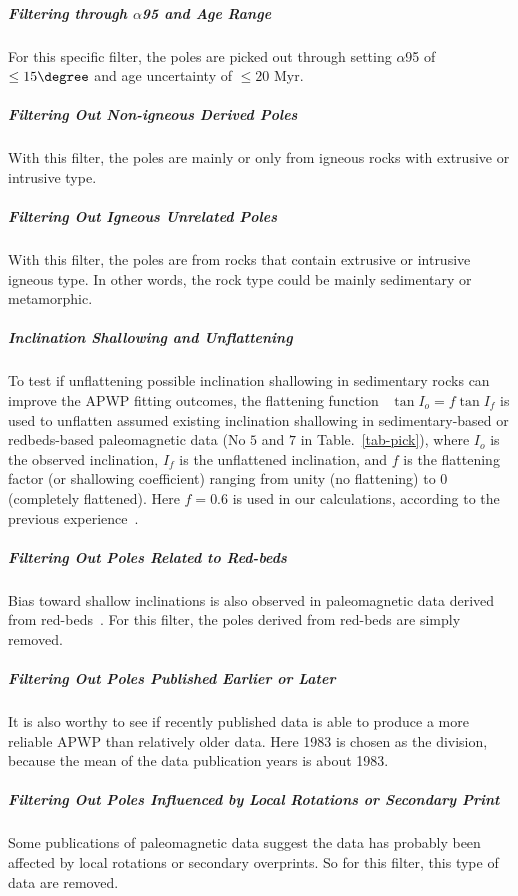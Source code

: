\subparagraph{Filtering through $\alpha$95 and Age Range}

For this specific filter, the poles are picked out through setting $\alpha$95 of
$\leq15\degree$ and age uncertainty of $\leq20$ Myr.

\subparagraph{Filtering Out Non-igneous Derived Poles}

With this filter, the poles are mainly or only from igneous rocks with extrusive
or intrusive type.

\subparagraph{Filtering Out Igneous Unrelated Poles}

With this filter, the poles are from rocks that contain extrusive or intrusive
igneous type. In other words, the rock type could be mainly sedimentary or
metamorphic.

\subparagraph{Inclination Shallowing and Unflattening}

To test if unflattening possible inclination shallowing in sedimentary rocks can
improve the APWP fitting outcomes, the flattening function~\cite{K55} $\tan I_o
= f \tan I_f$ is used to unflatten assumed existing inclination shallowing in
sedimentary-based or redbeds-based paleomagnetic data (No $5$ and $7$ in
Table.~\ref{tab-pick}), where $I_o$ is the observed inclination, $I_f$ is the
unflattened inclination, and $f$ is the flattening factor (or shallowing
coefficient) ranging from unity (no flattening) to 0 (completely flattened).
Here $f=0.6$ is used in our calculations, according to the previous
experience~\cite{T12}.

\subparagraph{Filtering Out Poles Related to Red-beds}

Bias toward shallow inclinations is also observed in paleomagnetic data derived
from red-beds~\cite{T04}. For this filter, the poles derived from red-beds are
simply removed.

\subparagraph{Filtering Out Poles Published Earlier or Later}

It is also worthy to see if recently published data is able to produce a more
reliable APWP than relatively older data. Here 1983 is chosen as the division,
because the mean of the data publication years is about 1983.

\subparagraph{Filtering Out Poles Influenced by Local Rotations or Secondary
Print}

Some publications of paleomagnetic data suggest the data has probably been
affected by local rotations or secondary overprints. So for this filter, this
type of data are removed.

